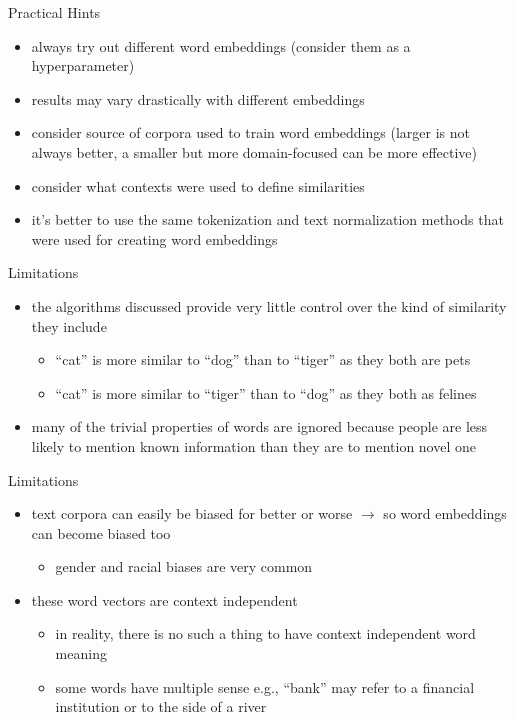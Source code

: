 \documentclass[12pt, handout]{beamer}
\begin{document}
\begin{frame}{Practical Hints}
	\begin{itemize}
		\item<1-> always try out different word embeddings (consider them as a hyperparameter)
		\item<2-> results may vary drastically with different embeddings
		\item<3-> consider source of corpora used to train word embeddings (larger is not always better, a smaller but more domain-focused can be more effective)
		\item<4-> consider what contexts  were used to define similarities 
		\item<5-> it's better to use the same tokenization and text normalization methods that  were used for creating word embeddings
	\end{itemize}
\end{frame}





\begin{frame}{Limitations}
	\begin{itemize}
		\item<1-> the algorithms discussed provide very little control over the kind of similarity they include
		\begin{itemize}
			\item<2-> ``cat'' is more similar to ``dog'' than to ``tiger'' as they both are pets
			\item<3-> ``cat'' is more similar to ``tiger'' than to ``dog'' as they both as felines
		\end{itemize}
		\item<4-> many of the trivial properties of words are ignored because people are less likely to mention known information than they are to mention novel one
		
	\end{itemize}
\end{frame}
\begin{frame}{Limitations}\begin{itemize}
		\item<1-> text corpora can easily be biased for better or worse $\rightarrow$  so word embeddings can become biased too
		\begin{itemize}
			\item<2-> gender and racial biases are very common
		\end{itemize}
		\item<3-> these word vectors are context independent
		\begin{itemize}
			\item<4-> in reality, there is no such a thing to have context independent word meaning
			\item<5-> some words have multiple sense e.g., ``bank'' may refer to a financial institution or to the side of a river
		\end{itemize}
	\end{itemize}
\end{frame}
\end{document}
